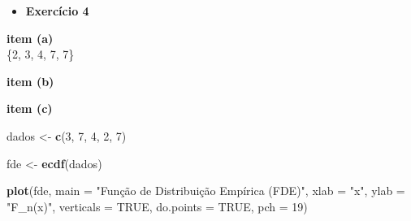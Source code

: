 \documentclass[
]{book}
\newenvironment{Shaded}{\begin{snugshade}}{\end{snugshade}}
\newcommand{\AttributeTok}[1]{\textcolor[rgb]{0.13,0.29,0.53}{#1}}
\newcommand{\ConstantTok}[1]{\textcolor[rgb]{0.56,0.35,0.01}{#1}}
\newcommand{\DecValTok}[1]{\textcolor[rgb]{0.00,0.00,0.81}{#1}}
\newcommand{\FunctionTok}[1]{\textcolor[rgb]{0.13,0.29,0.53}{\textbf{#1}}}
\newcommand{\NormalTok}[1]{#1}
\newcommand{\OtherTok}[1]{\textcolor[rgb]{0.56,0.35,0.01}{#1}}
\newcommand{\StringTok}[1]{\textcolor[rgb]{0.31,0.60,0.02}{#1}}
\providecommand{\tightlist}{%
  \setlength{\itemsep}{0pt}\setlength{\parskip}{0pt}}
\begin{document}
\begin{itemize}
\tightlist
\item
  \textbf{Exercício 4}
\end{itemize}

\textbf{item (a)}\\
\{2, 3, 4, 7, 7\}

\textbf{item (b)}

\begin{table}[!h]
\centering\begingroup\fontsize{8}{10}\selectfont

\endgroup{}
\end{table}

\textbf{item (c)}

\begin{Shaded}
\begin{Highlighting}[]
\NormalTok{dados }\OtherTok{\textless{}{-}} \FunctionTok{c}\NormalTok{(}\DecValTok{3}\NormalTok{, }\DecValTok{7}\NormalTok{, }\DecValTok{4}\NormalTok{, }\DecValTok{2}\NormalTok{, }\DecValTok{7}\NormalTok{)}

\NormalTok{fde }\OtherTok{\textless{}{-}} \FunctionTok{ecdf}\NormalTok{(dados)}

\FunctionTok{plot}\NormalTok{(fde, }\AttributeTok{main =} \StringTok{"Função de Distribuição Empírica (FDE)"}\NormalTok{, }
     \AttributeTok{xlab =} \StringTok{"x"}\NormalTok{, }\AttributeTok{ylab =} \StringTok{"F\_n(x)"}\NormalTok{, }\AttributeTok{verticals =} \ConstantTok{TRUE}\NormalTok{, }\AttributeTok{do.points =} \ConstantTok{TRUE}\NormalTok{, }\AttributeTok{pch =} \DecValTok{19}\NormalTok{)}
\end{Highlighting}
\end{Shaded}
\end{document}
